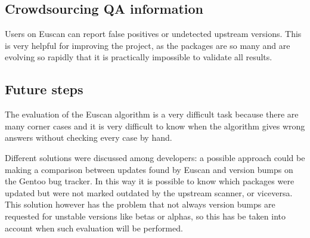\subsection{Crowdsourcing QA information}
Users on Euscan can report false positives or undetected upstream versions. This is very helpful for improving the project, as the packages are so many and are evolving so rapidly that it is practically impossible to validate all results.

\subsection{Future steps}
The evaluation of the Euscan algorithm is a very difficult task because there are many corner cases and it is very difficult to know when the algorithm gives wrong answers without checking every case by hand.

Different solutions were discussed among developers: a possible approach could be making a comparison between updates found by Euscan and version bumps on the Gentoo bug tracker. In this way it is possible to know which packages were updated but were not marked outdated by the upstream scanner, or viceversa. This solution however has the problem that not always version bumps are requested for unstable versions like betas or alphas, so this has be taken into account when such evaluation will be performed.